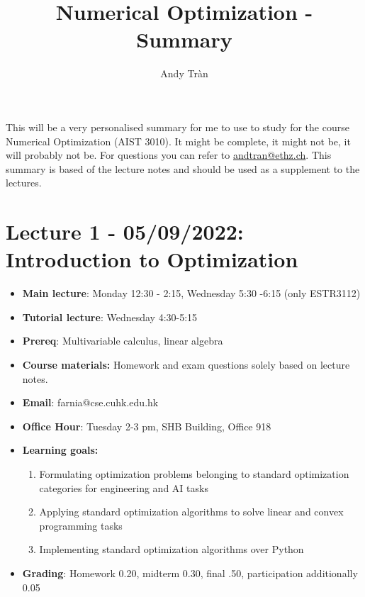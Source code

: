\documentclass[11pt]{article}
\begin{document}
 
 
\title{Numerical Optimization - Summary}%
\author{Andy Tràn}
 
\maketitle %

This will be a very personalised summary for me to use to study for the course Numerical Optimization (AIST 3010). It might be complete, it might not be, it will probably not be. For questions you can refer to \href{mailto:andtran@ethz.ch}{andtran@ethz.ch}. This summary is based of the lecture notes and should be used as a supplement to the lectures. 

\tableofcontents

\newpage

\section{Lecture 1 - 05/09/2022: Introduction to Optimization}
\begin{itemize}
    \item \textbf{Main lecture}: Monday 12:30 - 2:15, Wednesday 5:30 -6:15 (only ESTR3112)
    \item \textbf{Tutorial lecture}: Wednesday 4:30-5:15
    \item \textbf{Prereq}: Multivariable calculus, linear algebra
    \item \textbf{Course materials:} Homework and exam questions solely based on lecture notes.
    \item \textbf{Email}: farnia@cse.cuhk.edu.hk
    \item \textbf{Office Hour}: Tuesday 2-3 pm, SHB Building, Office 918
    \item \textbf{Learning goals:}  \begin{enumerate}
        \item Formulating optimization problems belonging to standard optimization categories for engineering and AI tasks
        \item Applying standard optimization algorithms to solve linear and convex programming tasks
        \item Implementing standard optimization algorithms over Python
    \end{enumerate}
    \item \textbf{Grading}: Homework 0.20, midterm 0.30, final .50, participation additionally 0.05 
\end{itemize}
\end{document}
